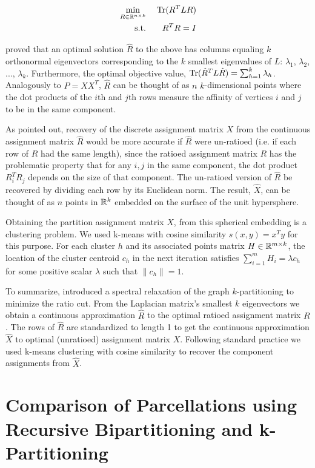 \begin{equation} \label{spectral_k-partition}
\begin{aligned}
\min_{R \in \mathbb{R}^{n \times k}} &\;& \operatorname{Tr}(R^T L R) \\
\text{s.t.}                  &\;& R^T R = I    \\
\end{aligned}
\end{equation}

\cite{Fan:50} proved that an optimal solution $\hat{R}$ to the above
has columns equaling $k$ orthonormal eigenvectors corresponding to
the $k$ smallest eigenvalues of $L$:
$\lambda_1$, $\lambda_2$, ..., $\lambda_k$.
Furthermore, the optimal objective value,
$\operatorname{Tr}(\hat{R}^T L \hat{R}) = \sum_{h=1}^k \lambda_h$.
Analogously to $P = X X^T$, $\hat{R}$ can be thought of as $n$
$k$-dimensional points where the dot products of the $i$th and $j$th
rows measure the affinity of vertices $i$ and $j$ to be in the same
component.

As \cite{Chan:94} pointed out, recovery of the discrete assignment matrix
$X$ from the continuous assignment matrix $\hat{R}$ would be more
accurate if $\hat{R}$ were un-ratioed (i.e. if each row of $R$ had the
same length), since the ratioed assignment matrix $R$ has the
problematic property that for any $i,j$ in the same component, the dot
product $R_i^T R_j$ depends on the size of that component.
The un-ratioed version of $\hat{R}$ be recovered by dividing each row
by its Euclidean norm. The result, $\hat{X}$, can be thought of as $n$
points in $\mathbb{R}^k$ embedded on the surface of the unit hypersphere.

Obtaining the partition assignment matrix $X$, from this spherical
embedding is a clustering problem. We used k-means with cosine
similarity $s(x,y) = x^T y$ for this purpose. For each cluster $h$
and its associated points matrix $H \in \mathbb{R}^{m \times k}$, the
location of the cluster centroid $c_h$ in the next iteration satisfies
$ \sum_{i=1}^m H_i = \lambda c_h $ for some positive scalar $\lambda$
such that $ \| c_h \| = 1$.

To summarize, \cite{Chan:94} introduced a spectral relaxation of the
graph $k$-partitioning to minimize the ratio cut. From the Laplacian
matrix's smallest $k$ eigenvectors we obtain a continuous approximation
$\hat{R}$ to the optimal ratioed assignment matrix $R$. The rows of
$\hat{R}$ are standardized to length 1 to get the continuous
approximation $\hat{X}$ to optimal (unratioed) assignment matrix $X$.
Following standard practice we used k-means clustering with cosine
similarity to recover the component assignments from $\hat{X}$.

\section{Comparison of Parcellations using Recursive Bipartitioning
and k-Partitioning}




